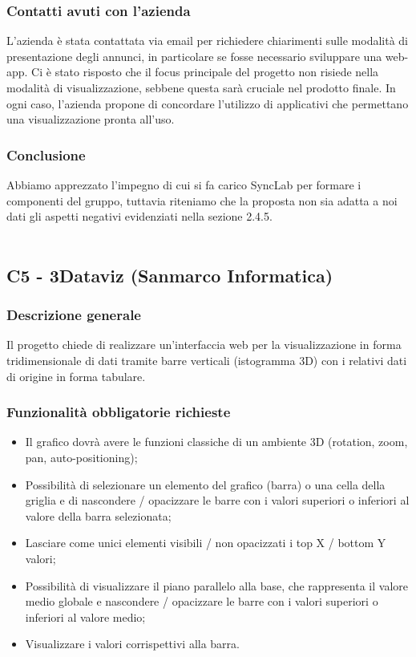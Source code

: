 \documentclass[10pt]{article}
\begin{document}
\subsubsection{Contatti avuti con l'azienda}
L'azienda è stata contattata via email per richiedere chiarimenti sulle modalità di presentazione degli annunci, in particolare se fosse necessario sviluppare una web-app. Ci è stato risposto che il focus principale del progetto non risiede nella modalità di visualizzazione, sebbene questa sarà cruciale nel prodotto finale. In ogni caso, l'azienda propone di concordare l'utilizzo di applicativi che permettano una visualizzazione pronta all'uso.
\subsubsection{Conclusione}
Abbiamo apprezzato l’impegno di cui si fa carico SyncLab per formare i componenti del gruppo, tuttavia riteniamo che la proposta non sia adatta a noi dati gli aspetti negativi evidenziati nella sezione 2.4.5.
\\\\
\subsection{C5 - 3Dataviz (Sanmarco Informatica)}
\subsubsection{Descrizione generale}
Il progetto chiede di realizzare un'interfaccia web per la visualizzazione in forma
tridimensionale di dati tramite barre verticali (istogramma 3D) con i relativi dati di origine in forma tabulare.
\subsubsection{Funzionalità obbligatorie richieste}
\begin{itemize}
    \item Il grafico dovrà avere le funzioni classiche di un ambiente 3D (rotation, zoom, pan, auto-positioning);
    \item Possibilità di selezionare un elemento del grafico (barra) o una cella della griglia e di nascondere / opacizzare le barre con i valori superiori o inferiori al valore della barra selezionata;
    \item Lasciare come unici elementi visibili / non opacizzati i top X / bottom Y valori;
    \item Possibilità di visualizzare il piano parallelo alla base, che rappresenta il valore medio globale e nascondere / opacizzare le barre con i valori superiori o inferiori al valore medio;
    \item Visualizzare i valori corrispettivi alla barra.
\end{itemize}
\end{document}
